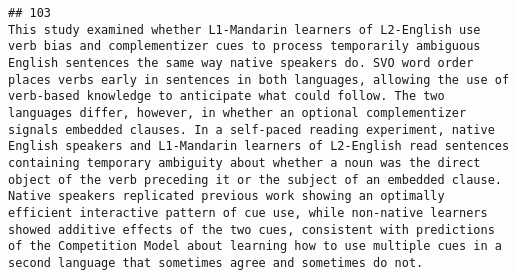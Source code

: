 \documentclass[
  english,
  man]{apa6}
\begin{document}
\begin{verbatim}
## 103                                                                                                                                                                                                                                                                                                                                                                                                                                                                                                                                                                                                                                                                                                                                                                                                                                                                                                                                                                                                                                                                                                                                                                                                                                                                                                                                                                                                                                                                                                                                                                                                                               This study examined whether L1-Mandarin learners of L2-English use verb bias and complementizer cues to process temporarily ambiguous English sentences the same way native speakers do. SVO word order places verbs early in sentences in both languages, allowing the use of verb-based knowledge to anticipate what could follow. The two languages differ, however, in whether an optional complementizer signals embedded clauses. In a self-paced reading experiment, native English speakers and L1-Mandarin learners of L2-English read sentences containing temporary ambiguity about whether a noun was the direct object of the verb preceding it or the subject of an embedded clause. Native speakers replicated previous work showing an optimally efficient interactive pattern of cue use, while non-native learners showed additive effects of the two cues, consistent with predictions of the Competition Model about learning how to use multiple cues in a second language that sometimes agree and sometimes do not.

\end{verbatim}
\end{document}
